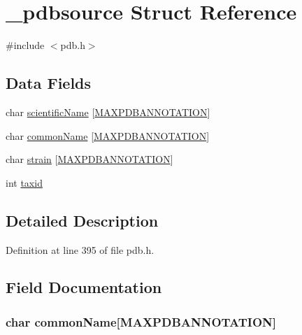 \hypertarget{struct__pdbsource}{\section{\-\_\-pdbsource Struct Reference}
\label{struct__pdbsource}
}


{\ttfamily \#include $<$pdb.\-h$>$}

\subsection*{Data Fields}
\begin{DoxyCompactItemize}
\item 
char \hyperlink{struct__pdbsource_a7761f6c6c0d24703a78977a91dd07cf9}{scientific\-Name} \mbox{[}\hyperlink{pdb_8h_a36d777b67f3c5ea7f278936e66305787}{M\-A\-X\-P\-D\-B\-A\-N\-N\-O\-T\-A\-T\-I\-O\-N}\mbox{]}
\item 
char \hyperlink{struct__pdbsource_a597f9dd8caa2adb0e75c88b88949764a}{common\-Name} \mbox{[}\hyperlink{pdb_8h_a36d777b67f3c5ea7f278936e66305787}{M\-A\-X\-P\-D\-B\-A\-N\-N\-O\-T\-A\-T\-I\-O\-N}\mbox{]}
\item 
char \hyperlink{struct__pdbsource_a751a93e79b2982e0ad9f67d7dfe95ac5}{strain} \mbox{[}\hyperlink{pdb_8h_a36d777b67f3c5ea7f278936e66305787}{M\-A\-X\-P\-D\-B\-A\-N\-N\-O\-T\-A\-T\-I\-O\-N}\mbox{]}
\item 
int \hyperlink{struct__pdbsource_a61dafcf04c90116e256fd50ac91c4966}{taxid}
\end{DoxyCompactItemize}


\subsection{Detailed Description}


Definition at line 395 of file pdb.\-h.



\subsection{Field Documentation}
\hypertarget{struct__pdbsource_a597f9dd8caa2adb0e75c88b88949764a}{
\subsubsection[{common\-Name}]{\setlength{\rightskip}{0pt plus 5cm}char common\-Name\mbox{[}{\bf M\-A\-X\-P\-D\-B\-A\-N\-N\-O\-T\-A\-T\-I\-O\-N}\mbox{]}}}\label{struct__pdbsource_a597f9dd8caa2adb0e75c88b88949764a}


